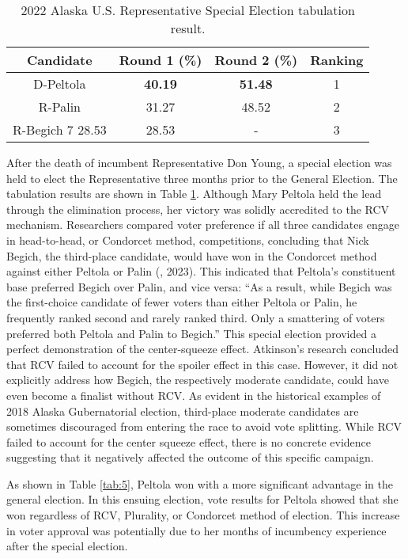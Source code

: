 \documentclass[12pt, a4paper, twoside]{article}
\begin{document}
\begin{table}[h]
\centering
\begin{tabular}{|c|c|c|c|}
\hline
Candidate & Round 1 (\%) & Round 2 (\%) & Ranking \\\hline
D-Peltola & \textbf{40.19} & \textbf{51.48} & 1 \\ \hline
R-Palin & 31.27 & 48.52 & 2 \\ \hline
R-Begich 7 28.53 & 28.53 & - & 3 \\ \hline
\end{tabular}
\caption{2022 Alaska U.S. Representative Special Election tabulation result.}
\label{tab:6}
\end{table}

After the death of incumbent Representative Don Young, a special election was held to elect the Representative three months prior to the General Election. The tabulation results are shown in Table \ref{tab:6}. Although Mary Peltola held the lead through the elimination process, her victory was solidly accredited to the RCV mechanism. Researchers compared voter preference if all three candidates engage in head-to-head, or Condorcet method, competitions, concluding that Nick Begich, the third-place candidate, would have won in the Condorcet method against either Peltola or Palin (\cite{atkinson2023}, 2023). This indicated that Peltola’s constituent base preferred Begich over Palin, and vice versa: “As a result, while Begich was the first-choice candidate of fewer voters than either Peltola or Palin, he frequently ranked second and rarely ranked third. Only a smattering of voters preferred both Peltola and Palin to Begich.” This special election provided a perfect demonstration of the center-squeeze effect. Atkinson’s research concluded that RCV failed to account for the spoiler effect in this case. However, it did not explicitly address how Begich, the respectively moderate candidate, could have even become a finalist without RCV. As evident in the historical examples of 2018 Alaska Gubernatorial election, third-place moderate candidates are sometimes discouraged from entering the race to avoid vote splitting. While RCV failed to account for the center squeeze effect, there is no concrete evidence suggesting that it negatively affected the outcome of this specific campaign. 

As shown in Table \ref{tab:5}, Peltola won with a more significant advantage in the general election. In this ensuing election, vote results for Peltola showed that she won regardless of RCV, Plurality, or Condorcet method of election. This increase in voter approval was potentially due to her months of incumbency experience after the special election. 
\end{document}
